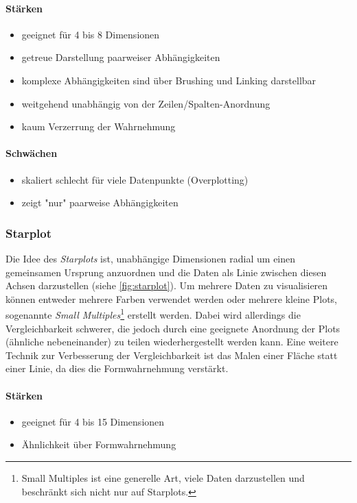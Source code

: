\paragraph{Stärken}
\begin{itemize}
	\item geeignet für 4 bis 8 Dimensionen
	\item getreue Darstellung paarweiser Abhängigkeiten
	\item komplexe Abhängigkeiten sind über Brushing und Linking darstellbar
	\item weitgehend unabhängig von der Zeilen/Spalten-Anordnung
	\item kaum Verzerrung der Wahrnehmung
\end{itemize}

\paragraph{Schwächen}
	\begin{itemize}
		\item skaliert schlecht für viele Datenpunkte (Overplotting)
		\item zeigt "nur" paarweise Abhängigkeiten
	\end{itemize}

\subsubsection{Starplot}
Die Idee des \emph{Starplots} ist, unabhängige Dimensionen radial um einen gemeinsamen Ursprung anzuordnen und die Daten als Linie zwischen diesen Achsen darzustellen (siehe \autoref{fig:starplot}). Um mehrere Daten zu visualisieren können entweder mehrere Farben verwendet werden oder mehrere kleine Plots, sogenannte \emph{Small Multiples}\footnote{Small Multiples ist eine generelle Art, viele Daten darzustellen und beschränkt sich nicht nur auf Starplots.} erstellt werden. Dabei wird allerdings die Vergleichbarkeit schwerer, die jedoch durch eine geeignete Anordnung der Plots (ähnliche nebeneinander) zu teilen wiederhergestellt werden kann. Eine weitere Technik zur Verbesserung der Vergleichbarkeit ist das Malen einer Fläche statt einer Linie, da dies die Formwahrnehmung verstärkt.

\paragraph{Stärken}
\begin{itemize}
	\item geeignet für 4 bis 15 Dimensionen
	\item Ähnlichkeit über Formwahrnehmung
\end{itemize}

